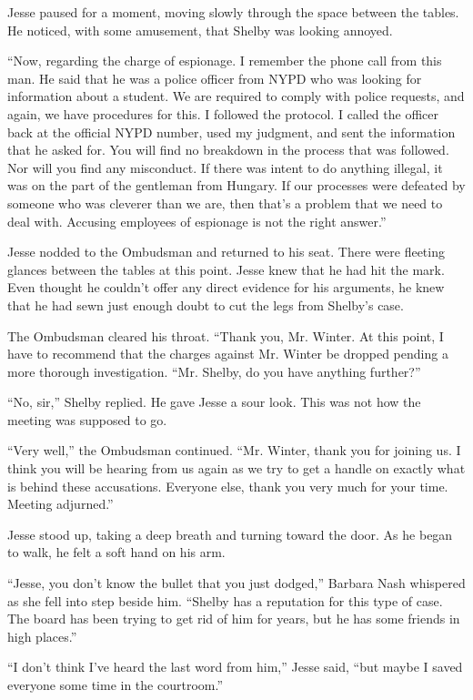 \documentclass[12pt]{book}
\begin{document}
Jesse paused for a moment, moving slowly through the space between the tables.  He noticed, with some amusement, that Shelby was looking annoyed.

``Now, regarding the charge of espionage.  I remember the phone call from this man.  He said that he was a police officer from NYPD who was looking for information about a student.  We are required to comply with police requests, and again, we have procedures for this.  I followed the protocol.  I called the officer back at the official NYPD number, used my judgment, and sent the information that he asked for.  You will find no breakdown in the process that was followed.  Nor will you find any misconduct.  If there was intent to do anything illegal, it was on the part of the gentleman from Hungary.  If our processes were defeated by someone who was cleverer than we are, then that's a problem that we need to deal with.  Accusing employees of espionage is not the right answer.''

Jesse nodded to the Ombudsman and returned to his seat.  There were fleeting glances between the tables at this point.  Jesse knew that he had hit the mark.  Even thought he couldn't offer any direct evidence for his arguments, he knew that he had sewn just enough doubt to cut the legs from Shelby's case.

The Ombudsman cleared his throat.  ``Thank you, Mr. Winter.  At this point, I have to recommend that the charges against Mr. Winter be dropped pending a more thorough investigation.  ``Mr. Shelby, do you have anything further?''

``No, sir,'' Shelby replied.  He gave Jesse a sour look.  This was not how the meeting was supposed to go.

``Very well,'' the Ombudsman continued.  ``Mr. Winter, thank you for joining us.  I think you will be hearing from us again as we try to get a handle on exactly what is behind these accusations.  Everyone else, thank you very much for your time.  Meeting adjurned.''

Jesse stood up, taking a deep breath and turning toward the door.  As he began to walk, he felt a soft hand on his arm.

``Jesse, you don't know the bullet that you just dodged,'' Barbara Nash whispered as she fell into step beside him.  ``Shelby has a reputation for this type of case.  The board has been trying to get rid of him for years, but he has some friends in high places.''

``I don't think I've heard the last word from him,'' Jesse said, ``but maybe I saved everyone some time in the courtroom.''
\end{document}
